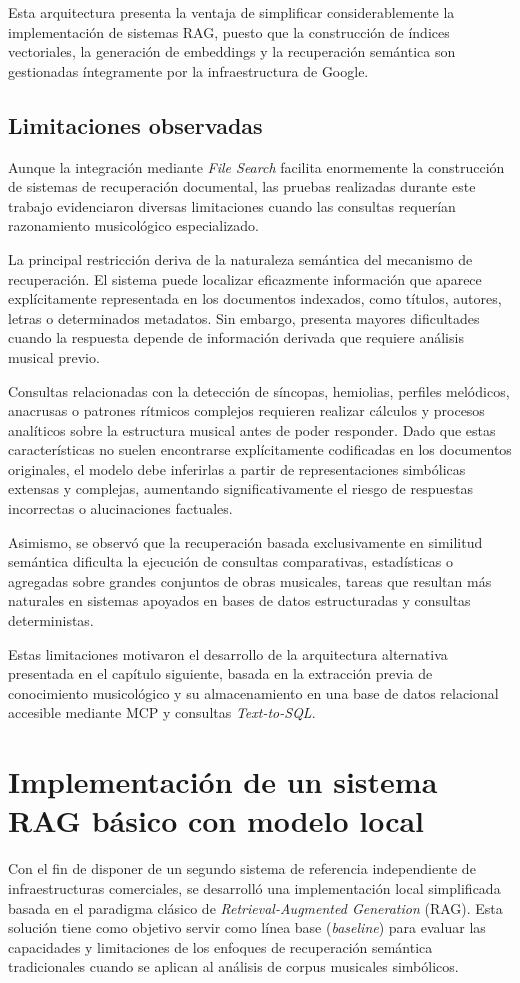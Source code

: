 Esta arquitectura presenta la ventaja de simplificar considerablemente la implementación de sistemas RAG, puesto que la construcción de índices vectoriales, la generación de embeddings y la recuperación semántica son gestionadas íntegramente por la infraestructura de Google.

\subsection{Limitaciones observadas}
Aunque la integración mediante \textit{File Search} facilita enormemente la construcción de sistemas de recuperación documental, las pruebas realizadas durante este trabajo evidenciaron diversas limitaciones cuando las consultas requerían razonamiento musicológico especializado.

La principal restricción deriva de la naturaleza semántica del mecanismo de recuperación. El sistema puede localizar eficazmente información que aparece explícitamente representada en los documentos indexados, como títulos, autores, letras o determinados metadatos. Sin embargo, presenta mayores dificultades cuando la respuesta depende de información derivada que requiere análisis musical previo.

Consultas relacionadas con la detección de síncopas, hemiolias, perfiles melódicos, anacrusas o patrones rítmicos complejos requieren realizar cálculos y procesos analíticos sobre la estructura musical antes de poder responder. Dado que estas características no suelen encontrarse explícitamente codificadas en los documentos originales, el modelo debe inferirlas a partir de representaciones simbólicas extensas y complejas, aumentando significativamente el riesgo de respuestas incorrectas o alucinaciones factuales.

Asimismo, se observó que la recuperación basada exclusivamente en similitud semántica dificulta la ejecución de consultas comparativas, estadísticas o agregadas sobre grandes conjuntos de obras musicales, tareas que resultan más naturales en sistemas apoyados en bases de datos estructuradas y consultas deterministas.

Estas limitaciones motivaron el desarrollo de la arquitectura alternativa presentada en el capítulo siguiente, basada en la extracción previa de conocimiento musicológico y su almacenamiento en una base de datos relacional accesible mediante MCP y consultas \textit{Text-to-SQL}.

\section{Implementación de un sistema RAG básico con modelo local}
Con el fin de disponer de un segundo sistema de referencia independiente de infraestructuras comerciales, se desarrolló una implementación local simplificada basada en el paradigma clásico de \textit{Retrieval-Augmented Generation} (RAG). Esta solución tiene como objetivo servir como línea base (\textit{baseline}) para evaluar las capacidades y limitaciones de los enfoques de recuperación semántica tradicionales cuando se aplican al análisis de corpus musicales simbólicos.

